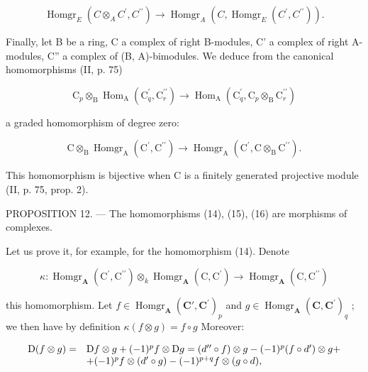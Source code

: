 \[
\operatorname{Homgr} _ {E} \left(C \otimes_ {A} C ^ {\prime}, C ^ {\prime \prime}\right)\rightarrow \operatorname{Homgr} _ {A} \left(C, \operatorname{Homgr} _ {E} \left(C ^ {\prime}, C ^ {\prime \prime}\right)\right).\tag{15}
\]

Finally, let B be a ring, C a complex of right B-modules, C' a complex of right A-modules, C'' a complex of (B, A)-bimodules. We deduce from the canonical homomorphisms (II, p. 75)

\[
\mathrm{C} _ {p} \otimes_ {\mathrm{B}} \operatorname{Hom} _ {\mathrm{A}} \left(\mathrm{C} _ {q} ^ {\prime}, \mathrm{C} _ {r} ^ {\prime \prime}\right)\rightarrow \operatorname{Hom} _ {\mathrm{A}} \left(\mathrm{C} _ {q} ^ {\prime}, \mathrm{C} _ {p} \otimes_ {\mathrm{B}} \mathrm{C} _ {r} ^ {\prime \prime}\right)
\]

a graded homomorphism of degree zero:

\[
\mathrm{C} \otimes_ {\mathrm{B}} \operatorname{Homgr} _ {\mathrm{A}} \left(\mathrm{C} ^ {\prime}, \mathrm{C} ^ {\prime \prime}\right)\rightarrow \operatorname{Homgr} _ {\mathrm{A}} \left(\mathrm{C} ^ {\prime}, \mathrm{C} \otimes_ {\mathrm{B}} \mathrm{C} ^ {\prime \prime}\right).\tag{16}
\]

This homomorphism is bijective when C is a finitely generated projective module (II, p. 75, prop. 2).

PROPOSITION 12. --- The homomorphisms (14), (15), (16) are morphisms of complexes.

Let us prove it, for example, for the homomorphism (14). Denote

\[
\kappa : \operatorname{Homgr} _ {\mathbf {A}} \left(\mathrm{C} ^ {\prime}, \mathrm{C} ^ {\prime \prime}\right) \otimes_ {k} \operatorname{Homgr} _ {\mathbf {A}} \left(\mathrm{C}, \mathrm{C} ^ {\prime}\right)\rightarrow \operatorname{Homgr} _ {\mathbf {A}} \left(\mathrm{C}, \mathrm{C} ^ {\prime \prime}\right)
\]

this homomorphism. Let \(f \in \operatorname{Homgr}_{\mathbf{A}}(\mathbf{C}', \mathbf{C}^{\prime})_{p}\) and \(g \in \operatorname{Homgr}_{\mathbf{A}}(\mathbf{C}, \mathbf{C}^{\prime})_{q}\) ; we then have by definition \(\kappa(f \otimes g) = f \circ g\) Moreover:

\[
\begin{array}{r l} \mathrm{D} (f \otimes g) = & \mathrm{D} f \otimes g + (- 1) ^ {p} f \otimes \mathrm{D} g = (d ^ {\prime \prime} \circ f) \otimes g - (- 1) ^ {p} (f \circ d ^ {\prime}) \otimes g + \\ & + (- 1) ^ {p} f \otimes (d ^ {\prime} \circ g) - (- 1) ^ {p + q} f \otimes (g \circ d), \end{array}
\]

